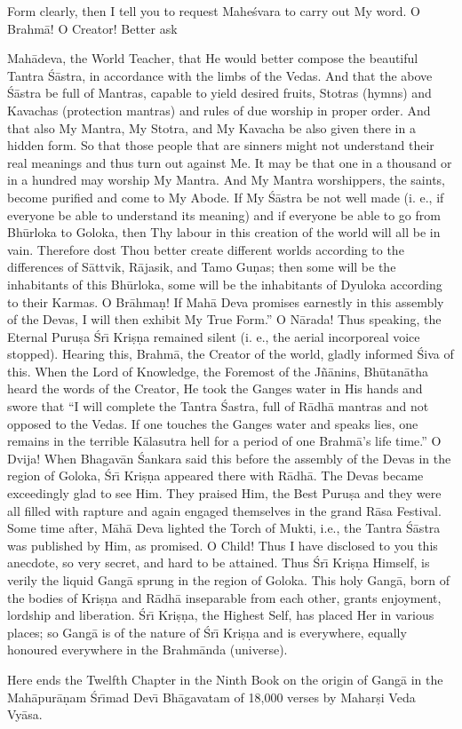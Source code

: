 Form clearly, then I tell you to request Mahe\'svara to carry out My word. O Brahm\=a! O Creator! Better ask

Mah\=adeva, the World Teacher, that He would better compose the beautiful Tantra \'S\=astra, in accordance with the limbs of the Vedas. And that the above \'S\=astra be full of Mantras, capable to yield desired fruits, Stotras (hymns) and Kavachas (protection mantras) and rules of due worship in proper order. And that also My Mantra, My Stotra, and My Kavacha be also given there in a hidden form. So that those people that are sinners might not understand their real meanings and thus turn out against Me. It may be that one in a thousand or in a hundred may worship My Mantra. And My Mantra worshippers, the saints, become purified and come to My Abode. If My \'S\=astra be not well made (i. e., if everyone be able to understand its meaning) and if everyone be able to go from Bh\=urloka to Goloka, then Thy labour in this creation of the world will all be in vain. Therefore dost Thou better create different worlds according to the differences of S\=attvik, R\=ajasik, and Tamo Gu\d{n}as; then some will be the inhabitants of this Bh\=urloka, some will be the inhabitants of Dyuloka according to their Karmas. O Br\=ahma\d{n}! If Mah\=a Deva promises earnestly in this assembly of the Devas, I will then exhibit My True Form.'' O N\=arada! Thus speaking, the Eternal Puru\d{s}a \'Sr\={\i} Kri\d{s}\d{n}a remained silent (i. e., the aerial incorporeal voice stopped). Hearing this, Brahm\=a, the Creator of the world, gladly informed \'Siva of this. When the Lord of Knowledge, the Foremost of the J\~n\=anins, Bh\=utan\=atha heard the words of the Creator, He took the Ganges water in His hands and swore that ``I will complete the Tantra \'Sastra, full of R\=adh\=a mantras and not opposed to the Vedas. If one touches the Ganges water and speaks lies, one remains in the terrible K\=alasutra hell for a period of one Brahm\=a's life time.'' O Dvija! When Bhagav\=an \'Sankara said this before the assembly of the Devas in the region of Goloka, \'Sr\={\i} Kri\d{s}\d{n}a appeared there with R\=adh\=a. The Devas became exceedingly glad to see Him. They praised Him, the Best Puru\d{s}a and they were all filled with rapture and again engaged themselves in the grand R\=asa Festival. Some time after, M\=ah\=a Deva lighted the Torch of Mukti, i.e., the Tantra \'S\=astra was published by Him, as promised. O Child! Thus I have disclosed to you this anecdote, so very secret, and hard to be attained. Thus \'Sr\={\i} Kri\d{s}\d{n}a Himself, is verily the liquid Gang\=a sprung in the region of Goloka. This holy Gang\=a, born of the bodies of Kri\d{s}\d{n}a and R\=adh\=a inseparable from each other, grants enjoyment, lordship and liberation. \'Sr\={\i} Kri\d{s}\d{n}a, the Highest Self, has placed Her in various places; so Gang\=a is of the nature of \'Sr\={\i} Kri\d{s}\d{n}a and is everywhere, equally honoured everywhere in the Brahm\=anda (universe).

Here ends the Twelfth Chapter in the Ninth Book on the origin of Gang\=a in the Mah\=apur\=a\d{n}am \'Sr\={\i}mad Dev\={\i} Bh\=agavatam of 18,000 verses by Mahar\d{s}i Veda Vy\=asa.



